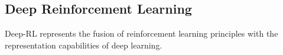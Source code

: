 
\subsection{Deep Reinforcement Learning}\label{subsection:bg:rl:deep-reinforcement-learning}

Deep-RL represents the fusion of reinforcement learning principles with the representation capabilities of deep learning.

